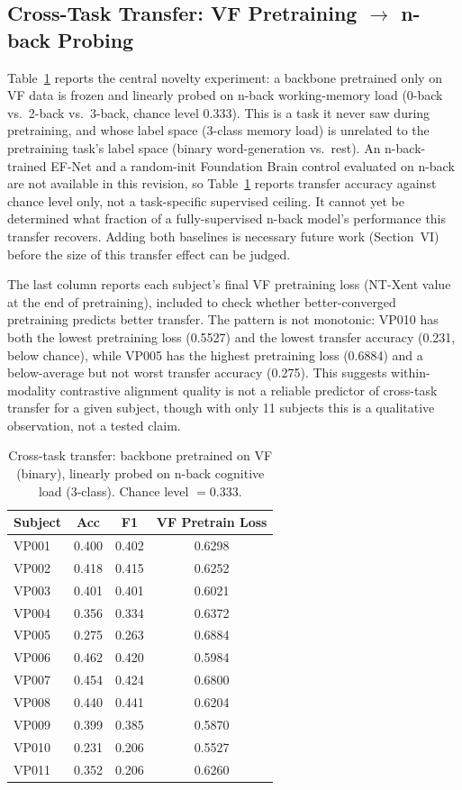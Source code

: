 \documentclass[journal]{IEEEtran}
\begin{document}
\subsection{Cross-Task Transfer: VF Pretraining $\to$ n-back Probing}
Table~\ref{tab:crosstask} reports the central novelty experiment: a backbone pretrained only on VF data is frozen and linearly probed on n-back working-memory load (0-back vs.\ 2-back vs.\ 3-back, chance level 0.333). This is a task it never saw during pretraining, and whose label space (3-class memory load) is unrelated to the pretraining task's label space (binary word-generation vs.\ rest). An n-back-trained EF-Net and a random-init Foundation Brain control evaluated on n-back are not available in this revision, so Table~\ref{tab:crosstask} reports transfer accuracy against chance level only, not a task-specific supervised ceiling. It cannot yet be determined what fraction of a fully-supervised n-back model's performance this transfer recovers. Adding both baselines is necessary future work (Section~VI) before the size of this transfer effect can be judged.

The last column reports each subject's final VF pretraining loss (NT-Xent value at the end of pretraining), included to check whether better-converged pretraining predicts better transfer. The pattern is not monotonic: VP010 has both the lowest pretraining loss (0.5527) and the lowest transfer accuracy (0.231, below chance), while VP005 has the highest pretraining loss (0.6884) and a below-average but not worst transfer accuracy (0.275). This suggests within-modality contrastive alignment quality is not a reliable predictor of cross-task transfer for a given subject, though with only 11 subjects this is a qualitative observation, not a tested claim.

\begin{table}[t]
\centering
\caption{Cross-task transfer: backbone pretrained on VF (binary), linearly probed on n-back cognitive load (3-class). Chance level $=0.333$.}
\label{tab:crosstask}
\footnotesize
\begin{tabular}{l c c c}
\toprule
Subject & Acc & F1 & VF Pretrain Loss \\
\midrule
VP001 & 0.400 & 0.402 & 0.6298 \\
VP002 & 0.418 & 0.415 & 0.6252 \\
VP003 & 0.401 & 0.401 & 0.6021 \\
VP004 & 0.356 & 0.334 & 0.6372 \\
VP005 & 0.275 & 0.263 & 0.6884 \\
VP006 & 0.462 & 0.420 & 0.5984 \\
VP007 & 0.454 & 0.424 & 0.6800 \\
VP008 & 0.440 & 0.441 & 0.6204 \\
VP009 & 0.399 & 0.385 & 0.5870 \\
VP010 & 0.231 & 0.206 & 0.5527 \\
VP011 & 0.352 & 0.206 & 0.6260 \\
\bottomrule
\end{tabular}
\end{table}
\end{document}
